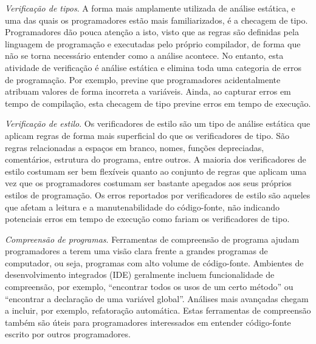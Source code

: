 \begin{description}

  \item \textit{Verificação de tipos}. 
    A forma mais amplamente utilizada de análise estática, e uma das quais os
    programadores estão mais familiarizados, é a checagem de tipo.
    Programadores dão pouca atenção a isto, visto que as regras são definidas
    pela linguagem de programação e executadas pelo próprio compilador, de
    forma que não se torna necessário entender como a análise acontece.  No
    entanto, esta atividade de verificação é análise estática e elimina toda
    uma categoria de erros de programação. Por exemplo, previne que
    programadores acidentalmente atribuam valores de forma incorreta a
    variáveis.  Ainda, ao capturar erros em tempo de compilação, esta checagem
    de tipo previne erros em tempo de execução.

  \item \textit{Verificação de estilo}. 
    Os verificadores de estilo são um tipo de análise estática que aplicam regras
    de forma mais superficial do que os verificadores de tipo. São regras
    relacionadas a espaços em branco, nomes, funções depreciadas, comentários,
    estrutura do programa, entre outros.  A maioria dos verificadores de
    estilo costumam ser bem flexíveis quanto ao conjunto de regras que aplicam
    uma vez que os programadores costumam ser bastante apegados aos seus
    próprios estilos de programação. Os erros reportados por verificadores de
    estilo são aqueles que afetam a leitura e a manutenabilidade do
    código-fonte, não indicando potenciais erros em tempo de execução como
    fariam os verificadores de tipo.

  \item \textit{Compreensão de programas}. 
    Ferramentas de compreensão de programa ajudam programadores a terem uma visão
    clara frente a grandes programas de computador, ou seja, programas com
    alto volume de código-fonte. Ambientes de desenvolvimento integrados (IDE)
    geralmente incluem funcionalidade de compreensão, por exemplo, ``encontrar
    todos os usos de um certo método'' ou ``encontrar a declaração de uma
    variável global''. Análises mais avançadas chegam a incluir, por exemplo,
    refatoração automática. Estas ferramentas de compreensão também são úteis
    para programadores interessados em entender código-fonte escrito por
    outros programadores.


\end{description}
